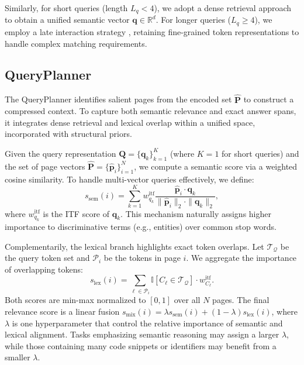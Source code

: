 \documentclass[11pt]{article}
\begin{document}
Similarly, for short queries (length $L_q < 4$), we adopt a dense retrieval approach \cite{karpukhin2020dense} to obtain a unified semantic vector $\mathbf{q}\in\mathbb{R}^{d}$. For longer queries ($L_q \ge 4$), we employ a late interaction strategy \cite{khattab2020colbert}, retaining fine-grained token representations to handle complex matching requirements.

\subsection{QueryPlanner}
\label{subsec:queryplanner}

The QueryPlanner identifies salient pages from the encoded set $\hat{\mathbf{P}}$ to construct a compressed context. To capture both semantic relevance and exact answer spans, it integrates dense retrieval and lexical overlap within a unified space, incorporated with structural priors.

Given the query representation $\mathbf{Q}=\{\mathbf{q}_k\}_{k=1}^K$ (where $K=1$ for short queries) and the set of page vectors $\hat{\mathbf{P}}=\{\hat{\mathbf{p}}_i\}_{i=1}^N$, we compute a semantic score via a weighted cosine similarity. To handle multi-vector queries effectively, we define:
\begin{equation}
s_{\mathrm{sem}}(i)=\sum_{k=1}^{K}w^{\text{itf}}_{q_k} \frac{\hat{\mathbf{p}}_i\cdot\mathbf{q}_k}{\|\hat{\mathbf{p}}_i\|_2\cdot\|\mathbf{q}_k\|_2},
\end{equation}
where $w^{\text{itf}}_{q_k}$ is the ITF score of $\mathbf{q}_k$. This mechanism naturally assigns higher importance to discriminative terms (e.g., entities) over common stop words.

Complementarily, the lexical branch highlights exact token overlaps. Let $\mathcal{T}_{\mathcal{Q}}$ be the query token set and $\mathcal{P}_i$ be the tokens in page $i$. We aggregate the importance of overlapping tokens:
\begin{equation}
s_{\mathrm{lex}}(i)
=
\sum_{\ell\in\mathcal{P}_i}
\mathbb{I}[C_\ell\in\mathcal{T}_{\mathcal{Q}}]\cdot w^{\text{itf}}_{C_\ell}.
\end{equation}
Both scores are min-max normalized to $[0,1]$ over all $N$ pages. The final relevance score is a linear fusion $s_{\mathrm{mix}}(i) = \lambda s_{\mathrm{sem}}(i) + (1-\lambda) s_{\mathrm{lex}}(i)$, where $\lambda$ is one hyperparameter that control the relative importance of semantic and lexical alignment. Tasks emphasizing semantic reasoning may assign a larger $\lambda$, while those containing many code snippets or identifiers may benefit from a smaller $\lambda$.  
\end{document}
